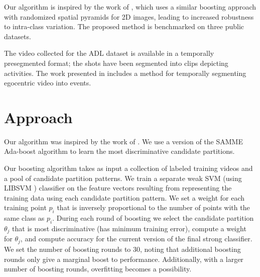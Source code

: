 \documentclass[10pt,twocolumn,letterpaper]{article}
\begin{document}
	Our algorithm is inspired by the work of \cite{Jiang12}, which uses a
	similar boosting approach with randomized spatial pyramids for 2D images, 
	leading to increased robustness to intra-class variation. The proposed
	method is benchmarked on three public datasets.
	
	The video collected for the ADL dataset is available in a temporally
	presegmented format; the shots have been segmented into clips depicting
	activities. The work presented in \cite{Lee12} includes a method for
	temporally segmenting egocentric video into events.


\section{Approach}
	Our algorithm was inspired by the work of \cite{Jiang12}. We use a
	version of the SAMME Ada-boost algorithm \cite{Zhu06} to learn the most
	discriminative candidate partitions.


	Our boosting algorithm takes as input a collection of labeled training videos
	and a pool of candidate partition patterns. We train a separate weak SVM 
  (using LIBSVM \cite{Chang11})
	classifier on the feature vectors resulting from representing the training
	data using each candidate partition pattern. We set a weight for each
	training point $p_i$ that is inversely proportional to the number of points
	with the same class as $p_i$. During each round of boosting we select the
	candidate partition $\theta_j$ that is most discriminative (has minimum training
	error), compute a weight for $\theta_j$, and compute accuracy for the
	current version of the final strong classifier. 
	We set the number of boosting rounds to 30, noting that additional boosting
	rounds only give a marginal boost to performance. Additionally, with a
	larger number of boosting rounds, overfitting becomes a possibility.\\

	
\end{document}
